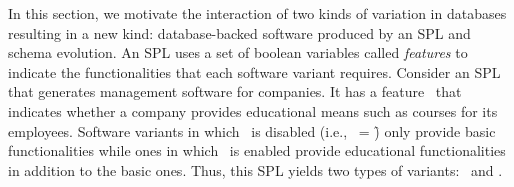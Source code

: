 

In this section, we motivate the interaction of two kinds of variation in databases 
resulting in a new kind:
database-backed software produced by an SPL and schema evolution.
An SPL uses a set of boolean variables called \emph{features} 
to indicate the functionalities that each software variant requires.
Consider an SPL that generates management software for companies. 
It has a feature \edu\ that 
indicates whether a company
provides educational means such as courses for its 
employees.
Software variants in which \edu\ is disabled (i.e., \edu\ = \f) only provide basic 
functionalities while ones in which \edu\ is enabled provide educational functionalities
in addition to the basic ones. Thus, this SPL yields two types of variants:
\basic\ and \educational.

